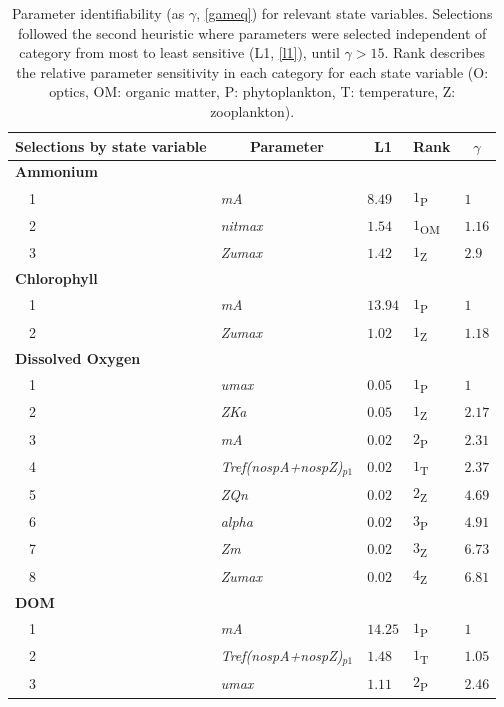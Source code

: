 \documentclass[preprint]{elsarticle}\usepackage[]{graphicx}\usepackage[]{color}
\begin{document}
\begin{table}[!tbp]
{\scriptsize
\caption{Parameter identifiability (as $\gamma$, \cref{gameq}) for relevant state variables.  Selections followed the second heuristic where parameters were selected independent of category from most to least sensitive (L1, \cref{l1}), until $\gamma > 15$.  Rank describes the relative parameter sensitivity in each category for each state variable (O: optics, OM: organic matter, P: phytoplankton, T: temperature, Z: zooplankton).\label{tab:heurist2}} 
\begin{center}
\begin{tabular}{lllll}
\hline\hline
\multicolumn{1}{l}{Selections by state variable}&\multicolumn{1}{c}{Parameter}&\multicolumn{1}{c}{L1}&\multicolumn{1}{c}{Rank}&\multicolumn{1}{c}{$\gamma$}\tabularnewline
\hline
{\bfseries Ammonium}&&&&\tabularnewline
~~1&\scriptsize{\textit{mA}}&$8.49$&$1$\textsubscript{P}&$1$\tabularnewline
~~2&\scriptsize{\textit{nitmax}}&$1.54$&$1$\textsubscript{OM}&$1.16$\tabularnewline
~~3&\scriptsize{\textit{Zumax}}&$1.42$&$1$\textsubscript{Z}&$2.9$\tabularnewline
\hline
{\bfseries Chlorophyll}&&&&\tabularnewline
~~1&\scriptsize{\textit{mA}}&$13.94$&$1$\textsubscript{P}&$1$\tabularnewline
~~2&\scriptsize{\textit{Zumax}}&$1.02$&$1$\textsubscript{Z}&$1.18$\tabularnewline
\hline
{\bfseries Dissolved Oxygen}&&&&\tabularnewline
~~1&\scriptsize{\textit{umax}}&$0.05$&$1$\textsubscript{P}&$1$\tabularnewline
~~2&\scriptsize{\textit{ZKa}}&$0.05$&$1$\textsubscript{Z}&$2.17$\tabularnewline
~~3&\scriptsize{\textit{mA}}&$0.02$&$2$\textsubscript{P}&$2.31$\tabularnewline
~~4&\scriptsize{\textit{Tref(nospA+nospZ)$_{p1}$}}&$0.02$&$1$\textsubscript{T}&$2.37$\tabularnewline
~~5&\scriptsize{\textit{ZQn}}&$0.02$&$2$\textsubscript{Z}&$4.69$\tabularnewline
~~6&\scriptsize{\textit{alpha}}&$0.02$&$3$\textsubscript{P}&$4.91$\tabularnewline
~~7&\scriptsize{\textit{Zm}}&$0.02$&$3$\textsubscript{Z}&$6.73$\tabularnewline
~~8&\scriptsize{\textit{Zumax}}&$0.02$&$4$\textsubscript{Z}&$6.81$\tabularnewline
\hline
{\bfseries DOM}&&&&\tabularnewline
~~1&\scriptsize{\textit{mA}}&$14.25$&$1$\textsubscript{P}&$1$\tabularnewline
~~2&\scriptsize{\textit{Tref(nospA+nospZ)$_{p1}$}}&$1.48$&$1$\textsubscript{T}&$1.05$\tabularnewline
~~3&\scriptsize{\textit{umax}}&$1.11$&$2$\textsubscript{P}&$2.46$\tabularnewline

\end{tabular}
\end{center}}
\end{table}
\end{document}
